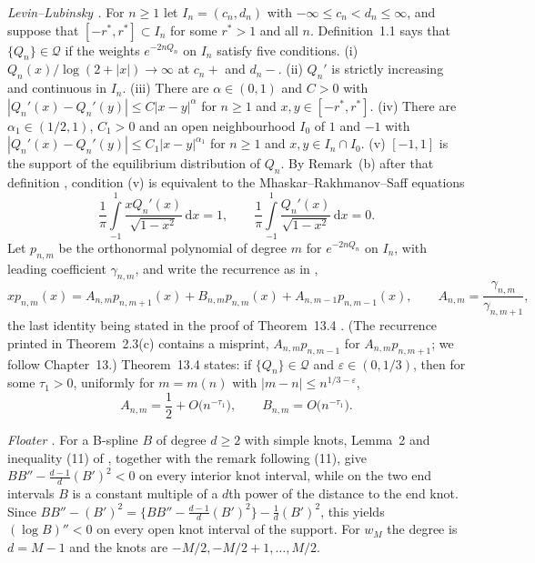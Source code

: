 \documentclass{math}
\let\TJMoriginalint\int
\renewcommand{\int}{\TJMoriginalint\limits}
\newcommand{\Qc}{\mathcal Q}
\newcommand{\dd}{\,\mathrm d}
\begin{document}
\emph{Levin--Lubinsky \cite{levinlubinsky2018}.} For $n\ge1$ let $I_n=(c_n,d_n)$ with $-\infty\le c_n<d_n\le\infty$, and suppose that $[-r^*,r^*]\subset I_n$ for some $r^*>1$ and all $n$. Definition~1.1 \cite[pp.~6--7]{levinlubinsky2018} says that $\{Q_n\}\in\Qc$ if the weights $e^{-2nQ_n}$ on $I_n$ satisfy five conditions. (i) $Q_n(x)/\log(2+|x|)\to\infty$ at $c_n+$ and $d_n-$. (ii) $Q_n'$ is strictly increasing and continuous in $I_n$. (iii) There are $\alpha\in(0,1)$ and $C>0$ with $|Q_n'(x)-Q_n'(y)|\le C|x-y|^\alpha$ for $n\ge1$ and $x,y\in[-r^*,r^*]$. (iv) There are $\alpha_1\in(1/2,1)$, $C_1>0$ and an open neighbourhood $I_0$ of $1$ and $-1$ with $|Q_n'(x)-Q_n'(y)|\le C_1|x-y|^{\alpha_1}$ for $n\ge1$ and $x,y\in I_n\cap I_0$. (v) $[-1,1]$ is the support of the equilibrium distribution of $Q_n$. By Remark~(b) after that definition \cite[p.~6]{levinlubinsky2018}, condition (v) is equivalent to the Mhaskar--Rakhmanov--Saff equations
\begin{equation}\label{eq:MRS}
\frac1\pi\int_{-1}^1\frac{xQ_n'(x)}{\sqrt{1-x^2}}\dd x=1,\qquad \frac1\pi\int_{-1}^1\frac{Q_n'(x)}{\sqrt{1-x^2}}\dd x=0 .
\end{equation}
Let $p_{n,m}$ be the orthonormal polynomial of degree $m$ for $e^{-2nQ_n}$ on $I_n$, with leading coefficient $\gamma_{n,m}$, and write the recurrence as in \cite[p.~124]{levinlubinsky2018},
\begin{equation}\label{eq:LLrec}
xp_{n,m}(x)=A_{n,m}p_{n,m+1}(x)+B_{n,m}p_{n,m}(x)+A_{n,m-1}p_{n,m-1}(x),\qquad A_{n,m}=\frac{\gamma_{n,m}}{\gamma_{n,m+1}} ,
\end{equation}
the last identity being stated in the proof of Theorem~13.4 \cite[p.~138]{levinlubinsky2018}. (The recurrence printed in Theorem~2.3(c) \cite[p.~12]{levinlubinsky2018} contains a misprint, $A_{n,m}p_{n,m-1}$ for $A_{n,m}p_{n,m+1}$; we follow Chapter~13.) Theorem~13.4 \cite[p.~124]{levinlubinsky2018} states: if $\{Q_n\}\in\Qc$ and $\varepsilon\in(0,1/3)$, then for some $\tau_1>0$, uniformly for $m=m(n)$ with $|m-n|\le n^{1/3-\varepsilon}$,
\begin{equation}\label{eq:LL134}
A_{n,m}=\frac12+O\bigl(n^{-\tau_1}\bigr),\qquad B_{n,m}=O\bigl(n^{-\tau_1}\bigr).
\end{equation}

\emph{Floater \cite{floater2024}.} For a B-spline $B$ of degree $d\ge2$ with simple knots, Lemma~2 and inequality (11) of \cite{floater2024}, together with the remark following (11), give $BB''-\frac{d-1}{d}(B')^2<0$ on every interior knot interval, while on the two end intervals $B$ is a constant multiple of a $d$th power of the distance to the end knot. Since $BB''-(B')^2=\{BB''-\frac{d-1}d(B')^2\}-\frac1d(B')^2$, this yields $(\log B)''<0$ on every open knot interval of the support. For $w_M$ the degree is $d=M-1$ and the knots are $-M/2,-M/2+1,\ldots,M/2$.
\end{document}
